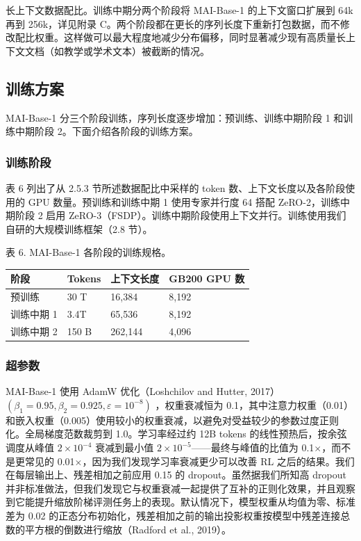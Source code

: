 \documentclass[
  10
]{article}
\newcounter{none} %
\begin{document}
长上下文数据配比。训练中期分两个阶段将 MAI-Base-1 的上下文窗口扩展到 64k 再到 256k，详见附录 C。两个阶段都在更长的序列长度下重新打包数据，而不修改配比权重。这样做可以最大程度地减少分布偏移，同时显著减少现有高质量长上下文文档（如教学或学术文本）被截断的情况。

\subsection{训练方案}\label{training-recipe}

MAI-Base-1 分三个阶段训练，序列长度逐步增加：预训练、训练中期阶段 1 和训练中期阶段 2。下面介绍各阶段的训练方案。

\subsubsection{训练阶段}\label{training-phases}

表 6 列出了从 2.5.3 节所述数据配比中采样的 token 数、上下文长度以及各阶段使用的 GPU 数量。预训练和训练中期 1 使用专家并行度 64 搭配 ZeRO-2，训练中期阶段 2 启用 ZeRO-3（FSDP）。训练中期阶段使用上下文并行。训练使用我们自研的大规模训练框架（2.8 节）。

表 6. MAI-Base-1 各阶段的训练规格。

{\def\LTcaptype{none} %
\begin{longtable}[]{@{}|l|l|l|l|@{}}
\toprule\noalign{}
\endhead
\bottomrule\noalign{}
\endlastfoot
\hline
阶段 & Tokens & 上下文长度 & GB200 GPU 数 \\
\hline
预训练 & 30 T & 16,384 & 8,192 \\
\hline
训练中期 1 & 3.4T & 65,536 & 8,192 \\
\hline
训练中期 2 & 150 B & 262,144 & 4,096 \\
\hline
\end{longtable}
}

\subsubsection{超参数}\label{hyperparameters}

MAI-Base-1 使用 AdamW 优化（Loshchilov and Hutter, 2017）
\(( \beta _ { 1 } = 0 . 9 5 , \beta _ { 2 } = 0 . 9 2 5 , \varepsilon = 1 0 ^ { - 8 } )\)
，权重衰减恒为 0.1，其中注意力权重（0.01）和嵌入权重（0.005）使用较小的权重衰减，以避免对受益较少的参数过度正则化。全局梯度范数裁剪到 1.0。学习率经过约 12B tokens 的线性预热后，按余弦调度从峰值 \(2 \times 10^{-4}\) 衰减到最小值 $2 \times 10^{-5}$——最终与峰值的比值为 0.1$\times$，而不是更常见的 0.01$\times$，因为我们发现学习率衰减更少可以改善 RL 之后的结果。我们在每层输出上、残差相加之前应用 0.15 的 dropout。虽然据我们所知高 dropout 并非标准做法，但我们发现它与权重衰减一起提供了互补的正则化效果，并且观察到它能提升缩放阶梯评测任务上的表现。默认情况下，模型权重从均值为零、标准差为 0.02 的正态分布初始化，残差相加之前的输出投影权重按模型中残差连接总数的平方根的倒数进行缩放（Radford et al., 2019）。
\end{document}
